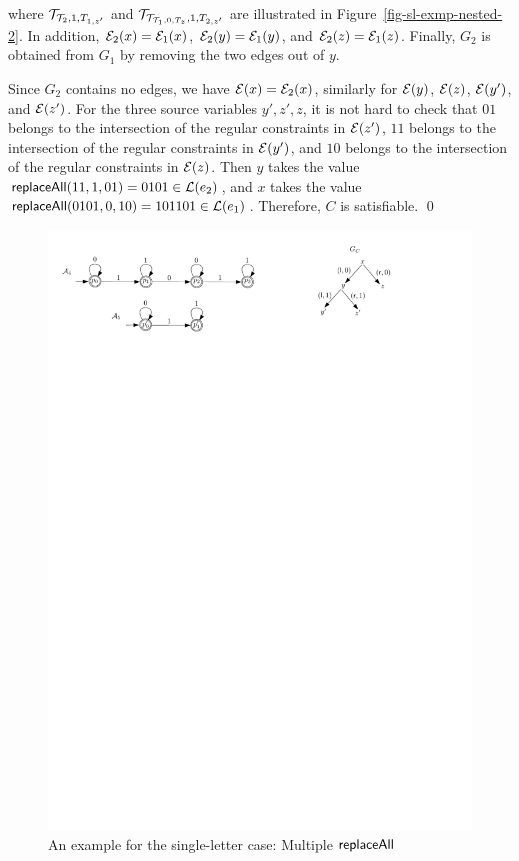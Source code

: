 \begin{example}
\begin{itemize}
where $\mathcal{T}_{\mathcal{T}_2, 1, T_{1,z'}}$ and $\mathcal{T}_{\mathcal{T}_{\mathcal{T}_1, 0, T_z}, 1, T_{2,z'}}$ are illustrated in Figure~\ref{fig-sl-exmp-nested-2}. In addition, $\mathcal{E}_2(x)=\mathcal{E}_1(x)$, $\mathcal{E}_2(y)=\mathcal{E}_1(y)$, and $\mathcal{E}_2(z)=\mathcal{E}_1(z)$. Finally, $G_2$ is obtained from $G_1$ by removing the two edges out of $y$.
%
\end{itemize}
Since $G_2$ contains no edges, we have $\mathcal{E}(x)=\mathcal{E}_2(x)$, similarly for $\mathcal{E}(y)$, $\mathcal{E}(z)$, $\mathcal{E}(y')$, and $\mathcal{E}(z')$.
For the three source variables $y', z', z$, it is not hard to check that $01$ belongs to the intersection of the regular constraints in $\mathcal{E}(z')$, $11$ belongs to the intersection of the regular constraints in $\mathcal{E}(y')$, and $10$ belongs to the intersection of the regular constraints in $\mathcal{E}(z)$. Then $y$ takes the value $\mathsf{replaceAll}(11, 1, 01)=0101 \in \mathcal{L}(e_2)$, and $x$ takes the value $\mathsf{replaceAll}(0101, 0, 10)=101101 \in \mathcal{L}(e_1)$. Therefore, $C$ is satisfiable. \qed
\begin{figure}[htbp]
\begin{center}
\includegraphics[scale=0.8]{single-letter-example-nested.pdf}
\end{center}
\caption{An example for the single-letter case: Multiple $\mathsf{replaceAll}$}\label{fig-sl-exmp-nested}
\end{figure}


\end{example}
